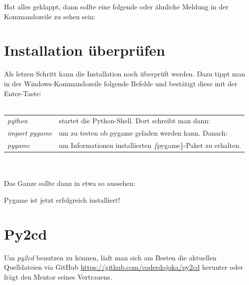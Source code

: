 \documentclass[ngerman,oneside, a4letter]{article}
\begin{document}
\pagebreak
\noindent Hat alles geklappt, dann sollte eine folgende oder ähnliche Meldung in der Kommandozeile zu sehen sein:
\begin{center}
\end{center}

\pagebreak
\section{Installation überprüfen}
Als letzen Schritt kann die Installation noch überprüft werden.
Dazu tippt man in der Windows-Kommandozeile folgende Befehle und bestätigt diese mit der Enter-Taste:
\\
\\
\begin{table}[h]
	\begin{tabular}{ll}

		\emph{python}        & startet die Python-Shell. Dort schreibt man dann:            \\ 
		\emph{import pygame} & um zu testen ob pygame geladen werden kann. Danach:                \\ 
		\emph{pygame}        & um Informationen  installierten \emph\{pygame\}-Paket zu erhalten. \\ 
	\end{tabular}
\end{table}
\\
\\
Das Ganze sollte dann in etwa so aussehen:
\begin{center}
\end{center}
Pygame ist jetzt erfolgreich installiert!

\section{Py2cd}
Um \emph{py2cd} benutzen zu können, lädt man sich am Besten die aktuellen Quelldateien via GitHub \url{https://github.com/coderdojoka/py2cd} herunter oder frägt den Mentor seines Vertrauens.
\end{document}
